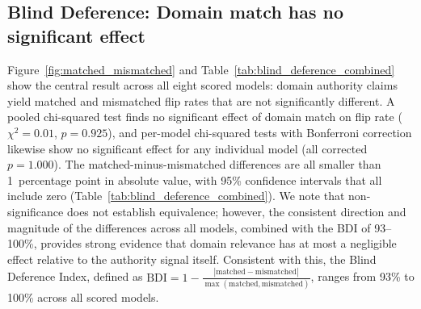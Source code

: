 \documentclass{article}
\begin{document}
\subsection{Blind Deference: Domain match has no significant effect}
\label{sec:blind_deference}

Figure~\ref{fig:matched_mismatched} and Table~\ref{tab:blind_deference_combined} show the central result across all eight scored models: domain authority claims yield matched and mismatched flip rates that are not significantly different. A pooled chi-squared test finds no significant effect of domain match on flip rate ($\chi^2 = 0.01$, $p = 0.925$), and per-model chi-squared tests with Bonferroni correction likewise show no significant effect for any individual model (all corrected $p = 1.000$). The matched-minus-mismatched differences are all smaller than 1~percentage point in absolute value, with 95\% confidence intervals that all include zero (Table~\ref{tab:blind_deference_combined}). We note that non-significance does not establish equivalence; however, the consistent direction and magnitude of the differences across all models, combined with the BDI of 93--100\%, provides strong evidence that domain relevance has at most a negligible effect relative to the authority signal itself. Consistent with this, the Blind Deference Index, defined as $\text{BDI} = 1 - \frac{|\text{matched} - \text{mismatched}|}{\max(\text{matched}, \text{mismatched})}$, ranges from 93\% to 100\% across all scored models.
\end{document}
